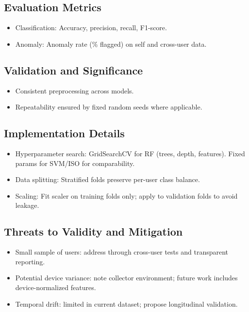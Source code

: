 \documentclass[
  12pt,
]{article}
\providecommand{\tightlist}{%
  \setlength{\itemsep}{0pt}\setlength{\parskip}{0pt}}
\begin{document}
\subsection{Evaluation Metrics}\label{evaluation-metrics}

\begin{itemize}
\tightlist
\item
  Classification: Accuracy, precision, recall, F1-score.
\item
  Anomaly: Anomaly rate (\% flagged) on self and cross-user data.
\end{itemize}

\subsection{Validation and
Significance}\label{validation-and-significance}

\begin{itemize}
\tightlist
\item
  Consistent preprocessing across models.
\item
  Repeatability ensured by fixed random seeds where applicable.
\end{itemize}

\subsection{Implementation Details}\label{implementation-details}

\begin{itemize}
\tightlist
\item
  Hyperparameter search: GridSearchCV for RF (trees, depth, features).
  Fixed params for SVM/ISO for comparability.
\item
  Data splitting: Stratified folds preserve per-user class balance.
\item
  Scaling: Fit scaler on training folds only; apply to validation folds
  to avoid leakage.
\end{itemize}

\subsection{Threats to Validity and
Mitigation}\label{threats-to-validity-and-mitigation}

\begin{itemize}
\tightlist
\item
  Small sample of users: address through cross-user tests and
  transparent reporting.
\item
  Potential device variance: note collector environment; future work
  includes device-normalized features.
\item
  Temporal drift: limited in current dataset; propose longitudinal
  validation.
\end{itemize}
\end{document}
